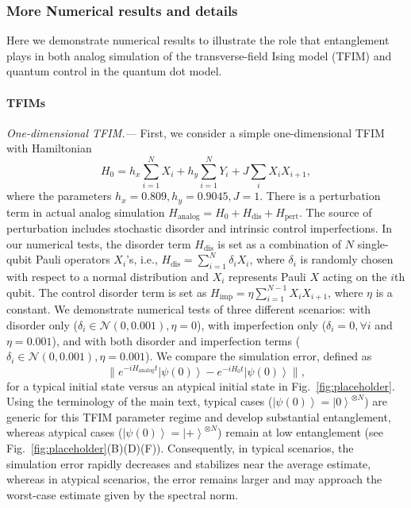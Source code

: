 \documentclass[12pt]{article}
\newcommand{\ket}[1]{\left|#1\right\rangle}
\begin{document}
        



















\subsubsection*{More Numerical results and details }
Here we demonstrate numerical results to illustrate the role that entanglement plays in both analog simulation of the transverse-field Ising model (TFIM) and quantum control in the quantum dot model.

\paragraph*{TFIMs}

\emph{One-dimensional TFIM.---} First, we consider a simple one-dimensional TFIM with Hamiltonian
\begin{equation}
    H_0=h_x\sum_{i=1}^NX_i+h_y\sum_{i=1}^NY_i+J\sum_iX_iX_{i+1},
\end{equation}
where the parameters $h_x=0.809,h_y=0.9045,J=1$. There is a perturbation term in actual analog simulation $H_{\text{analog}} =H_0+H_{\text{dis}}+ H_{\text{pert}}$. The source of perturbation includes stochastic disorder and
intrinsic control imperfections. In our numerical tests, the disorder term $H_{\text{dis}}$ is set as a combination of $N$ single-qubit Pauli operators $X_i$'s, i.e., $H_{\text{dis}}=\sum_{i=1}^N\delta_iX_i$, where $\delta_i$ is randomly chosen with respect to a normal distribution and $X_i$ represents Pauli $X$ acting on the $i$th qubit. The control disorder term is set as $H_{\text{imp}}=\eta\sum_{i=1}^{N-1}X_iX_{i+1}$, where $\eta$ is a constant. We demonstrate numerical tests of three different scenarios: with disorder only ($\delta_i\in\mathcal N(0,0.001),\eta=0$), with imperfection only ($\delta_i=0,\forall i$ and $\eta=0.001$), and with both disorder and imperfection terms ($\delta_i\in\mathcal N(0,0.001),\eta=0.001$). We compare the simulation error, defined as $$\|e^{-iH_{\text{analog}}t}\ket{\psi(0)}-e^{-iH_0t}\ket{\psi(0)}\|,$$ for a typical initial state versus an atypical initial state in Fig.~\ref{fig:placeholder}. Using the terminology of the main text, typical cases ($\ket{\psi(0)}=\ket{0}^{\otimes N}$) are generic for this TFIM parameter regime and develop substantial entanglement, whereas atypical cases ($\ket{\psi(0)}=\ket{+}^{\otimes N}$) remain at low entanglement (see Fig.~\ref{fig:placeholder}(B)(D)(F)). Consequently, in typical scenarios, the simulation error rapidly decreases and stabilizes near the average estimate, whereas in atypical scenarios, the error remains larger and may approach the worst-case estimate given by the spectral norm. 
\end{document}

